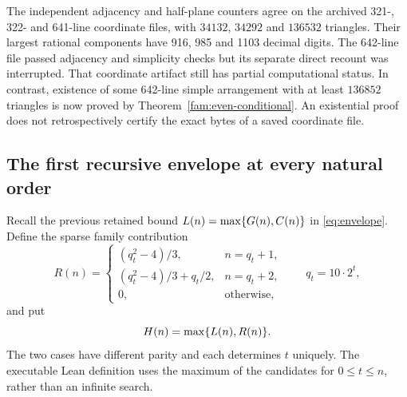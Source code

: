 The independent adjacency and half-plane counters agree on the archived
321-, 322- and 641-line coordinate files, with $34132$, $34292$ and
$136532$ triangles. Their largest rational components have 916, 985 and
1103 decimal digits. The 642-line file passed adjacency and simplicity
checks but its separate direct recount was interrupted. That coordinate
artifact still has partial computational status. In contrast, existence
of some 642-line simple arrangement with at least $136852$ triangles is
now proved by Theorem~\ref{fam:even-conditional}. An existential proof
does not retrospectively certify the exact bytes of a saved coordinate
file.

\subsection{The first recursive envelope at every natural order}

Recall the previous retained bound $L(n)=\max\{G(n),C(n)\}$ in
\eqref{eq:envelope}. Define the sparse family contribution
\begin{equation}
 R(n)=\begin{cases}
 (q_t^2-4)/3,& n=q_t+1,\\
 (q_t^2-4)/3+q_t/2,& n=q_t+2,\\
 0,&\text{otherwise},
 \end{cases}
 \qquad q_t=10\cdot2^t,
 \label{fam:sparse-bound}
\end{equation}
and put
\begin{equation}
 H(n)=\max\{L(n),R(n)\}.
 \label{fam:new-envelope}
\end{equation}
The two cases have different parity and each determines $t$ uniquely.
The executable Lean definition uses the maximum of the candidates for
$0\le t\le n$, rather than an infinite search.


